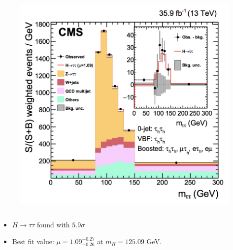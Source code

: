 \documentclass[xcolor={usenames,dvipsnames,svgnames,table}]{beamer}
\begin{document}
\begin{frame}
\begin{columns}
\begin{column}{0.49\textwidth}
\begin{figure}[t]
			\includegraphics[width=1.\textwidth]{plots/higgstautau.png}
		\end{figure}
	\end{column}
	\end{columns}
  \begin{itemize}
  	\item $H \rightarrow \tau\tau$ found with $5.9\sigma$
		\item Best fit value: $\mu = 1.09_{-0.26}^{+0.27}$ at $m_{H} = 125.09$ GeV.
  \end{itemize}
\end{frame}
\end{document}
